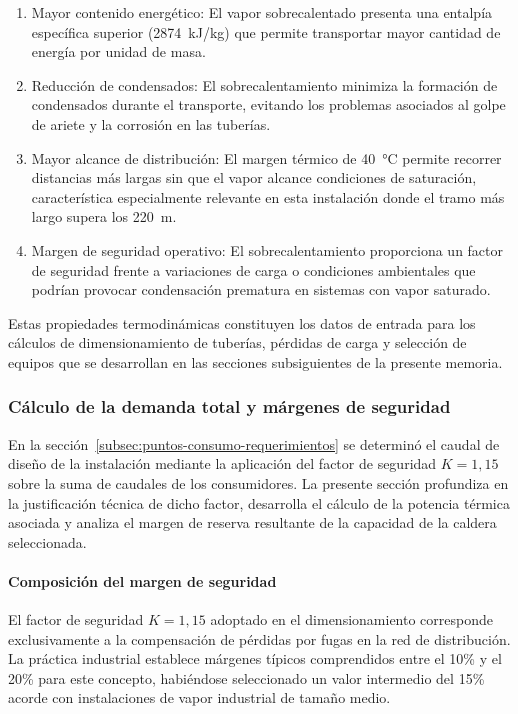 \documentclass[12pt]{article}
\begin{document}
\begin{enumerate}[label=\arabic*., leftmargin=2em]
	\item Mayor contenido energético: El vapor sobrecalentado presenta una entalpía específica superior (2874~kJ/kg) que permite transportar mayor cantidad de energía por unidad de masa.
	\item Reducción de condensados: El sobrecalentamiento minimiza la formación de condensados durante el transporte, evitando los problemas asociados al golpe de ariete y la corrosión en las tuberías.
	\item Mayor alcance de distribución: El margen térmico de 40~°C permite recorrer distancias más largas sin que el vapor alcance condiciones de saturación, característica especialmente relevante en esta instalación donde el tramo más largo supera los 220~m.
	\item Margen de seguridad operativo: El sobrecalentamiento proporciona un factor de seguridad frente a variaciones de carga o condiciones ambientales que podrían provocar condensación prematura en sistemas con vapor saturado.
\end{enumerate}

Estas propiedades termodinámicas constituyen los datos de entrada para los cálculos de dimensionamiento de tuberías, pérdidas de carga y selección de equipos que se desarrollan en las secciones subsiguientes de la presente memoria.


\subsubsection{Cálculo de la demanda total y márgenes de seguridad}
\label{subsubsec:demanda-total-margenes}

En la sección~\ref{subsec:puntos-consumo-requerimientos} se determinó el caudal de diseño de la instalación mediante la aplicación del factor de seguridad $K = 1{,}15$ sobre la suma de caudales de los consumidores. La presente sección profundiza en la justificación técnica de dicho factor, desarrolla el cálculo de la potencia térmica asociada y analiza el margen de reserva resultante de la capacidad de la caldera seleccionada.

\paragraph{Composición del margen de seguridad}

El factor de seguridad $K = 1{,}15$ adoptado en el dimensionamiento corresponde exclusivamente a la compensación de pérdidas por fugas en la red de distribución. La práctica industrial establece márgenes típicos comprendidos entre el 10\% y el 20\% para este concepto, habiéndose seleccionado un valor intermedio del 15\% acorde con instalaciones de vapor industrial de tamaño medio.
\end{document}
